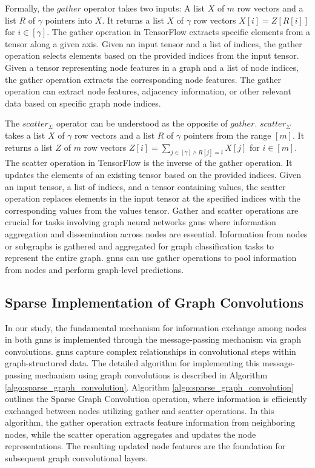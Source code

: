 
Formally, the $\mathit{gather}$ operator takes two inputs: A list $X$ of $m$ row vectors and a list $R$ of $\gamma$ pointers into $X$.
It returns a list $X$ of $\gamma$ row vectors $X[i] = Z[R[i]]$ for $i \in [\gamma]$.
The gather operation in TensorFlow extracts specific elements from a tensor along a given axis. Given an input tensor and a list of indices, the gather operation selects elements based on the provided indices from the input tensor. Given a tensor representing node features in a graph and a list of node indices, the gather operation extracts the corresponding node features. The gather operation can extract node features, adjacency information, or other relevant data based on specific graph node indices.

The $\mathit{scatter}_{\Sigma}$ operator can be understood as the opposite of $\mathit{gather}$.
$\mathit{scatter}_{\Sigma}$ takes a list $X$ of $\gamma$ row vectors and a list $R$ of $\gamma$ pointers from the range $[m]$.
It returns a list $Z$ of $m$ row vectors $Z[i] = \sum_{j \in [\gamma] \land R[j] = i} X[j]$ for $i \in [m]$.
The scatter operation in TensorFlow is the inverse of the gather operation. It updates the elements of an existing tensor based on the provided indices. Given an input tensor, a list of indices, and a tensor containing values, the scatter operation replaces elements in the input tensor at the specified indices with the corresponding values from the values tensor.
Gather and scatter operations are crucial for tasks involving graph neural networks \acp{gnn} where information aggregation and dissemination across nodes are essential. Information from nodes or subgraphs is gathered and aggregated for graph classification tasks to represent the entire graph.
\acp{gnn} can use gather operations to pool information from nodes and perform graph-level predictions.



\subsection{Sparse Implementation of Graph Convolutions}
\label{sec:implement:gnndropout:conv}
In our study, the fundamental mechanism for information exchange among nodes in both \acp{gnn} is implemented through the message-passing mechanism via graph convolutions.
\Acp{gnn} capture complex relationships in convolutional steps within graph-structured data. The detailed algorithm for implementing this message-passing mechanism using graph convolutions is described in Algorithm \ref{algo:sparse_graph_convolution}.
Algorithm \ref{algo:sparse_graph_convolution} outlines the Sparse Graph Convolution operation, where information is efficiently exchanged between nodes utilizing gather and scatter operations.
In this algorithm, the gather operation extracts feature information from neighboring nodes, while the scatter operation aggregates and updates the node representations.
The resulting updated node features are the foundation for subsequent graph convolutional layers.

